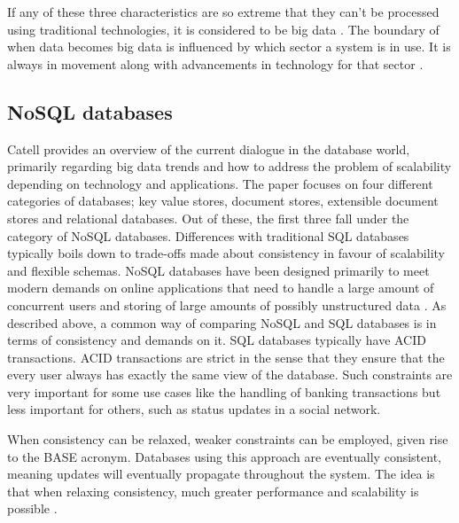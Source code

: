 If any of these three characteristics are so extreme that they can't be processed using traditional technologies, it is considered to be big data \cite{bigDataWarehouse}. The boundary of when data becomes big data is influenced by which sector a system is in use. It is always in movement along with advancements in technology for that sector \cite{bigDatabigAn}. 


\subsection{NoSQL databases}
Catell \cite{Catell} provides an overview of the current dialogue in the database world, primarily regarding big data trends and how to address the problem of scalability depending on technology and applications. The paper focuses on four different categories of databases; key value stores, document stores, extensible document stores and relational databases. Out of these, the first three fall under the category of NoSQL databases. Differences with traditional SQL databases typically boils down to trade-offs made about consistency in favour of scalability and flexible schemas. NoSQL databases have been designed primarily to meet modern demands on online applications that need to handle a large amount of concurrent users and storing of large amounts of possibly unstructured data \cite{Catell}.
As described above, a common way of comparing NoSQL and SQL databases is in terms of consistency and demands on it. SQL databases typically have ACID \cite{Mullins} transactions. ACID transactions are strict in the sense that they ensure that the every user always has exactly the same view of the database. Such constraints are very important for some use cases like the handling of banking transactions but less important for others, such as status updates in a social network.

When consistency can be relaxed, weaker constraints can be employed, given rise to the BASE \cite{Catell} acronym. Databases using this approach are eventually consistent, meaning updates will eventually propagate throughout the system. The idea is that when relaxing consistency, much greater performance and scalability is possible \cite{Catell}.

